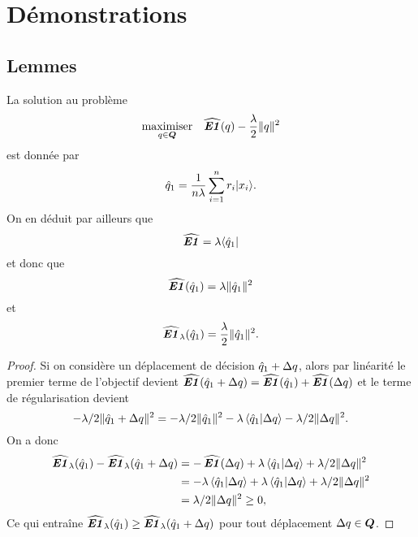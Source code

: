 \appendix
\section{Démonstrations}

\subsection{Lemmes}

\begin{lemme}
  \label{lem:ndef}
  La solution au problème
  \begin{equation}
    \maximizeEquation[q \in \Q]{\hEN(q) - \frac{\lambda}{2}\|q\|^2}
  \end{equation}
  est donnée par
  \begin{equation}
    \qh_1 = \frac{1}{n\lambda}\sumi r_i|x_i\rangle.
  \end{equation}
  On en déduit par ailleurs que
  \begin{equation}
    \hEN = \lambda\langle\qh_1|
  \end{equation}
  et donc que
  \begin{equation}
    \hEN(\qh_1) = \lambda\|\qh_1\|^2
  \end{equation}
  et
  \begin{equation}
    \hEN_\lambda(\qh_1) = \frac{\lambda}{2}\|\qh_1\|^2.
  \end{equation}
\end{lemme}

\begin{proof}
  Si on considère un déplacement de décision $\qh_1 + \Delta q$, alors par linéarité le premier
  terme de l'objectif devient $\hEN(\qh_1+\Delta q) = \hEN(\qh_1) + \hEN(\Delta q)$ et le terme de
  régularisation devient 
  \begin{equation}
    -\lambda/2\|\qh_1 + \Delta q\|^2 = -\lambda/2\|\qh_1\|^2 - \lambda\braket{\qh_1|\Delta q} - \lambda/2\|\Delta q\|^2.
  \end{equation}
  On a donc
  \begin{align}
    \hEN_\lambda(\qh_1)  - \hEN_\lambda(\qh_1+\Delta q) &= -\hEN(\Delta q) + \lambda\braket{\qh_1|\Delta q} + \lambda/2\|\Delta q\|^2\\
                                       &= -\lambda\braket{\qh_1|\Delta q} + \lambda\braket{\qh_1|\Delta q} +
                                         \lambda/2\|\Delta q\|^2\\
                                       &= \lambda/2\|\Delta q\|^2 \geq 0,
  \end{align}
  Ce qui entraîne $\hEN_\lambda(\qh_1) \geq \hEN_\lambda(\qh_1 + \Delta q)$ pour tout déplacement $\Delta q\in\Q$. 
\end{proof}


